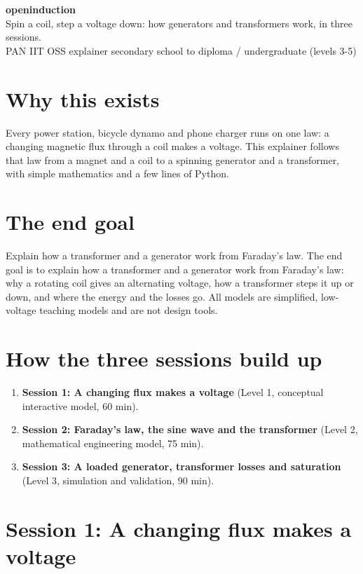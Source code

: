 \documentclass[11pt,a4paper]{article}
\begin{document}
\begin{center}{\LARGE\bfseries openinduction}\\[0.4em]{\large Spin a coil, step a voltage down: how generators and transformers work, in three sessions.}\\[0.2em]\small PAN IIT OSS explainer \textbullet{} secondary school to diploma / undergraduate (levels 3-5)\end{center}

\section*{Why this exists}
Every power station, bicycle dynamo and phone charger runs on one law: a changing magnetic flux through a coil makes a voltage. This explainer follows that law from a magnet and a coil to a spinning generator and a transformer, with simple mathematics and a few lines of Python.

\section*{The end goal}
Explain how a transformer and a generator work from Faraday's law. The end goal is to explain how a transformer and a generator work from Faraday's law: why a rotating coil gives an alternating voltage, how a transformer steps it up or down, and where the energy and the losses go. All models are simplified, low-voltage teaching models and are not design tools.

\section*{How the three sessions build up}
\begin{enumerate}[nosep]
\item \textbf{Session 1: A changing flux makes a voltage} (Level 1, conceptual interactive model, 60 min).
\item \textbf{Session 2: Faraday's law, the sine wave and the transformer} (Level 2, mathematical engineering model, 75 min).
\item \textbf{Session 3: A loaded generator, transformer losses and saturation} (Level 3, simulation and validation, 90 min).
\end{enumerate}

\section{Session 1: A changing flux makes a voltage}
\end{document}
